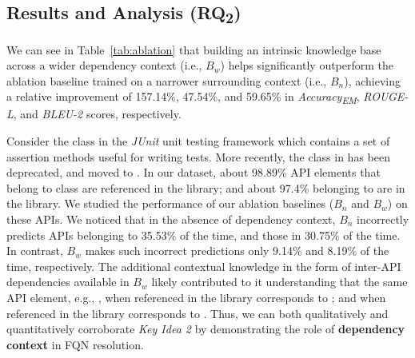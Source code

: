 \subsection*{Results and Analysis (RQ\textsubscript{2})}
\label{sec:rq2}

We can see in Table~\ref{tab:ablation} that building an intrinsic knowledge base across a wider dependency context (i.e., $B_w$) helps \tool significantly outperform the ablation baseline trained on a narrower surrounding context (i.e., $B_n$), achieving a relative improvement of 157.14\%, 47.54\%, and 59.65\% in \textit{Accuracy\textsubscript{EM}}, \textit{ROUGE-L}, and \textit{BLEU-2} scores, respectively. 

Consider the  class in the \textit{JUnit} unit testing framework which contains a set of assertion methods useful for writing tests. More recently, the  class in  has been deprecated, and moved to . In our dataset, about 98.89\% API elements that belong to  class are referenced in the  library; and about 97.4\% belonging to  are in the  library. We studied the performance of our ablation baselines ($B_n$ and $B_w$) on these APIs. We noticed that in the absence of dependency context, $B_n$ incorrectly predicts APIs belonging to  35.53\% of the time, and those in  30.75\% of the time. In contrast, $B_w$ makes such incorrect predictions only 9.14\% and 8.19\% of the time, respectively. The additional contextual knowledge in the form of inter-API dependencies available in $B_w$ likely contributed to it understanding that the same API element, e.g., , when referenced in the  library corresponds to ; and when referenced in the  library corresponds to . Thus, we can both qualitatively and quantitatively corroborate \textit{Key Idea 2} by demonstrating the role of {\bf dependency context} in FQN resolution.





